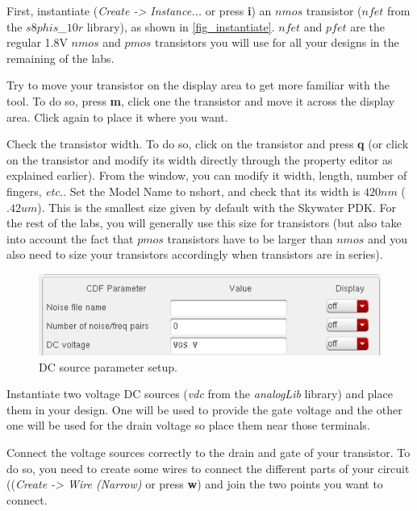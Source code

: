 \begin{enumerate}
{		\item First, instantiate (\textit{Create -> Instance...} or press \textbf{i}) an $nmos$ transistor (\textit{$nfet$} from the \textit{$s8phis$\_$10r$} library), as shown in \ref{fig_instantiate}. $nfet$ and $pfet$ are the regular 1.8V $nmos$ and $pmos$ transistors you will use for all your designs in the remaining of the labs.
		\item Try to move your transistor on the display area to get more familiar with the tool. To do so, press \textbf{m}, click one the transistor and move it across the display area. Click again to place it where you want.
		\item Check the transistor width. To do so, click on the transistor and press \textbf{q} (or click on the transistor and modify its width directly through the property editor as explained earlier). From the window, you can modify it width, length, number of fingers, \textit{etc.}. Set the Model Name to nshort, and check that its width is $420nm$ ($.42um$). This is the smallest size given by default with the Skywater PDK. For the rest of the labs, you will generally use this size for transistors (but also take into account the fact that $pmos$ transistors have to be larger than $nmos$ and you also need to size your transistors accordingly when transistors are in series).\newline } 
	
	\parbox[t]{\dimexpr\textwidth-\leftmargin}{%
		\begin{figure}
			\vspace{-0mm}
			\centering
			\vspace{-\baselineskip}
			\includegraphics[scale=0.5]{figures/lab1_schematic_sim/paramdc}
			\caption{DC source parameter setup.}
			\label{fig_paramdc}
		\end{figure}
		\item Instantiate two voltage DC sources (\textit{vdc} from the \textit{analogLib} library) and place them in your design. One will be used to provide the gate voltage and the other one will be used for the drain voltage so place them near those terminals.
		\item Connect the voltage sources correctly to the drain and gate of your transistor. To do so, you need to create some wires to connect the different parts of your circuit ((\textit{Create -> Wire (Narrow)} or press \textbf{w}) and join the two points you want to connect.\newline } 
	

\end{enumerate}
